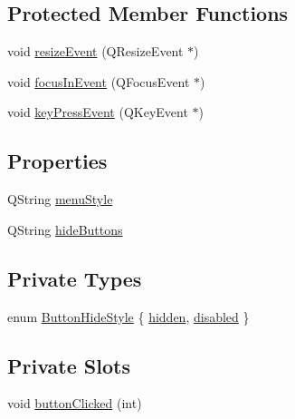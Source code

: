 \subsection*{Protected Member Functions}
\begin{DoxyCompactItemize}
\item 
void \hyperlink{classRingMenu_a321580d0f07f4498ef44ffc0a8d0527c}{resizeEvent} (QResizeEvent $\ast$)
\item 
void \hyperlink{classRingMenu_ab6b5988095b4d955fcdb58aed2a47320}{focusInEvent} (QFocusEvent $\ast$)
\item 
void \hyperlink{classRingMenu_a23ee1e4db5dda7e4bf83e46548ebb22a}{keyPressEvent} (QKeyEvent $\ast$)
\end{DoxyCompactItemize}
\subsection*{Properties}
\begin{DoxyCompactItemize}
\item 
QString \hyperlink{classRingMenu_af5694ea5c7af1ded9aedfbb44eaff454}{menuStyle}
\item 
QString \hyperlink{classRingMenu_ab945829d0a36844d2be8249414f587bd}{hideButtons}
\end{DoxyCompactItemize}
\subsection*{Private Types}
\begin{DoxyCompactItemize}
\item 
enum \hyperlink{classRingMenu_a549495d417ab0acc433800ec2badb3de}{ButtonHideStyle} \{ \hyperlink{classRingMenu_a549495d417ab0acc433800ec2badb3dea4874b2a8af3e7e62ee6666158882f615}{hidden}, 
\hyperlink{classRingMenu_a549495d417ab0acc433800ec2badb3dea7c0fea2b01048852bf3389e093bbd3e5}{disabled}
 \}
\end{DoxyCompactItemize}
\subsection*{Private Slots}
\begin{DoxyCompactItemize}
\item 
void \hyperlink{classRingMenu_ad28bad7db8ecd20ba7d7c5fea3151e3a}{buttonClicked} (int)
\end{DoxyCompactItemize}
